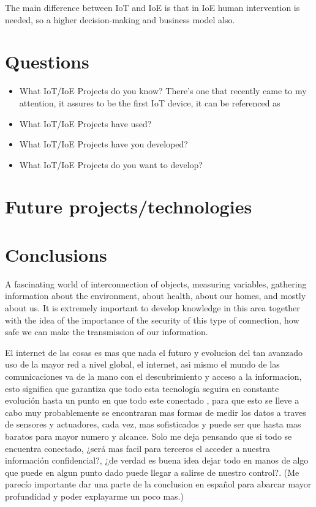 \documentclass{IEEEtran}
\begin{document}
The main difference between IoT and IoE is that in IoE human intervention is needed, so a higher decision-making and business model also.


\section{Questions }\label{systemModel}
\begin{itemize}
     \item What IoT/IoE Projects do you know?
     There's one that recently came to my attention, it assures to be the first IoT device, it can be referenced as \cite{xu2015animal}
     \item What IoT/IoE Projects have used?
     \item What IoT/IoE Projects have you developed?
     \item What IoT/IoE Projects do you want to develop?
\end{itemize}


\section{Future
projects/technologies}

\section{Conclusions}

A fascinating world of interconnection of objects, measuring variables, gathering information about the environment, about health, about our homes, and mostly about us.
It is extremely important to develop knowledge in this area together with the idea of the importance of the security of this type of connection, how safe we can make the transmission of our information.

El internet de las cosas es mas que nada el futuro y evolucion del tan avanzado uso de la mayor red a nivel global, el internet, asi mismo el mundo de las comunicaciones
va de la mano con el descubrimiento y acceso a la informacion, esto significa que garantiza que todo esta tecnología seguira en constante evolución hasta un punto en que todo este conectado 
, para que esto se lleve a cabo muy probablemente se encontraran mas formas de medir los datos a traves de sensores y actuadores, cada vez, mas sofisticados y puede ser 
que hasta mas baratos para mayor numero y alcance. Solo me deja pensando que si todo se encuentra conectado, ¿será mas facil para terceros el acceder a nuestra información 
confidencial?, ¿de verdad es buena idea dejar todo en manos de algo que puede en algun punto dado puede llegar a salirse de nuestro control?. 
(Me parecío importante dar una parte de la conclusion en español para abarcar mayor profundidad y poder explayarme un poco mas.)





\end{document}
